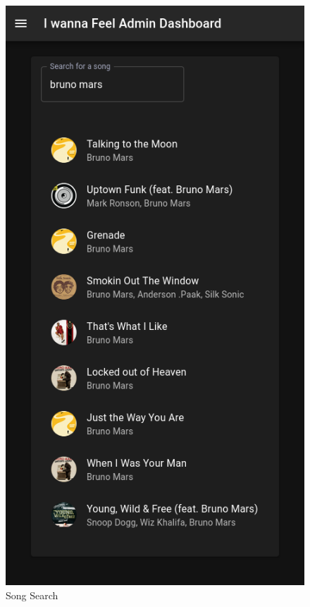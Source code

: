 \begin{figure}[H]
\centering
\includegraphics[scale=0.6]{imgs/mobileui2.png}
\caption{Song Search}
\label{fig: mobileUI_2}
\end{figure}

